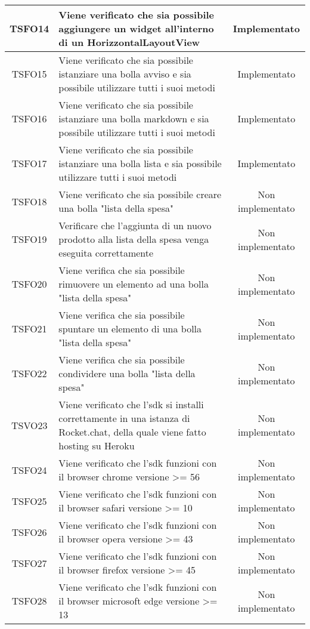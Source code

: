 \begin{center}
\begin{longtable}{|c|>{\centering}m{10cm}|c|}
		TSFO14 & Viene verificato che sia possibile aggiungere un widget all'interno di un HorizzontalLayoutView & Implementato \\ \hline
		TSFO15 & Viene verificato che sia possibile istanziare una bolla avviso e sia possibile utilizzare tutti i suoi metodi & Implementato \\ \hline
		TSFO16 & Viene verificato che sia possibile istanziare una bolla markdown e sia possibile utilizzare tutti i suoi metodi & Implementato \\ \hline
		TSFO17 & Viene verificato che sia possibile istanziare una bolla lista e sia possibile utilizzare tutti i suoi metodi & Implementato \\ \hline
		TSFO18 & Viene verificato che sia possibile creare una bolla "lista della spesa" & Non implementato \\ \hline
		TSFO19 & Verificare che l'aggiunta di un nuovo prodotto alla lista della spesa venga eseguita correttamente & Non implementato \\ \hline
		TSFO20 & Viene verifica che sia possibile rimuovere un elemento ad una bolla "lista della spesa" & Non implementato \\ \hline
		TSFO21 & Viene verifica che sia possibile spuntare un elemento di una bolla "lista della spesa" & Non implementato \\ \hline
		TSFO22 & Viene verifica che sia possibile condividere una bolla "lista della spesa" & Non implementato \\ \hline
		TSVO23 & Viene verificato che l'sdk si installi correttamente in una istanza di Rocket.chat, della quale viene fatto hosting su Heroku & Non implementato \\ \hline
		TSFO24 & Viene verificato che l'sdk funzioni con il browser chrome versione >= 56 & Non implementato \\ \hline
		TSFO25 & Viene verificato che l'sdk funzioni con il browser safari versione >= 10 & Non implementato \\ \hline
		TSFO26 & Viene verificato che l'sdk funzioni con il browser opera versione >= 43 & Non implementato \\ \hline
		TSFO27 & Viene verificato che l'sdk funzioni con il browser firefox versione >= 45 & Non implementato \\ \hline
		TSFO28 & Viene verificato che l'sdk funzioni con il browser microsoft edge versione >= 13 & Non implementato \\ \hline
	\end{longtable}
\end{center}
